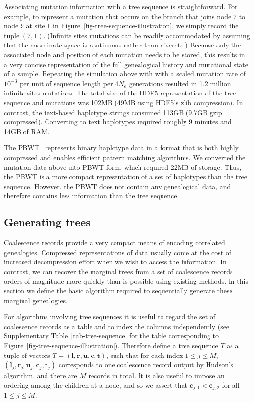 \documentclass[10pt]{article}
\newcommand{\vect}[1]{\ensuremath{\mathbf{#1}}}
\begin{document}
Associating mutation information with a tree sequence is straightforward.  For
example, to represent a mutation that occurs on the branch that
joins node $7$ to node $9$ at site $1$ in
Figure~\ref{fig-tree-sequence-illustration}, we simply record the tuple $(7,
1)$. (Infinite sites mutations can be readily accommodated by assuming that
the coordinate space is continuous rather than discrete.)
Because only the associated node and position of each mutation needs to
be stored, this results in a very concise representation of the full
genealogical history and mutational state of a sample. Repeating the simulation
above with with a scaled mutation rate of $10^{-3}$ per unit of sequence
length per $4N_e$ generations resulted in 1.2 million infinite sites
mutations. The total size of the
HDF5 representation of the tree sequence and mutations was 102MB (49MB using
HDF5's zlib compression). In contrast, the text-based haplotype strings
consumed 113GB (9.7GB gzip compressed). Converting to text haplotypes required
roughly 9 minutes and 14GB of RAM.

The PBWT~\citep{d14} represents binary haplotype data in a format that
is both highly compressed and enables efficient pattern matching algorithms. We
converted the mutation data above into PBWT form, which required 22MB
of storage. Thus, the PBWT is a more compact representation of a set of
haplotypes than the tree sequence. However, the PBWT does not contain any
genealogical data, and therefore contains less information than the tree
sequence.

\subsection{Generating trees}
\label{sec-generating-trees}

Coalescence records provide a very compact means of encoding correlated
genealogies. Compressed representations of data usually come at the cost of
increased decompression effort when we wish to access the information. In
contrast, we can recover the marginal trees from a set of coalescence records
orders of magnitude more quickly than is possible using existing methods. In
this section we define the basic algorithm required to sequentially generate
these marginal genealogies.

For algorithms involving tree sequences it is useful to regard the set of
coalescence records as a table and to index the columns independently (see
Supplementary Table~\ref{tab-tree-sequence} for the table corresponding to
Figure~\ref{fig-tree-sequence-illustration}).  Therefore define a tree sequence
$T$ as a tuple of vectors $T = (\vect{l}, \vect{r}, \vect{u}, \vect{c},
\vect{t})$, such that for each index $1 \leq j \leq M$, $(\vect{l}_j,
\vect{r}_j, \vect{u}_j, \vect{c}_j, \vect{t}_j)$ corresponds to one coalescence
record output by Hudson's algorithm, and there are $M$ records in total. It is
also useful to impose an ordering among the children at a node, and so we
assert that $\vect{c}_{j, 1} < \vect{c}_{j, 2}$ for all $1 \leq j \leq M$.
\end{document}
